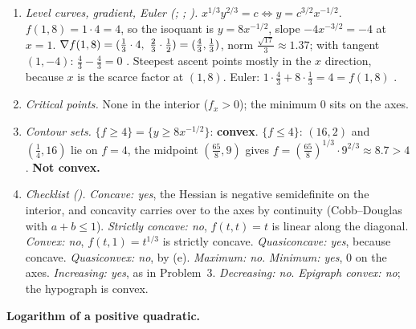 \begin{solutions}
\begin{enumerate}[label=(\alph*),leftmargin=1.8em,itemsep=0.4ex]
{                semidefinite}, not definite. The null direction is the ray
                itself: the first row times $(x,y)$ is
                $\tfrac29\bigl(-x^{-2/3}y^{2/3}+x^{-2/3}y^{2/3}\bigr)=0$,
                and likewise the second. Along a ray $f(tx,ty)=tf(x,y)$ is
                linear, so it has no curvature there.
          \item \emph{Level curves, gradient, Euler (;
                ; ).} $x^{1/3}y^{2/3}=c\iff y=c^{3/2}x^{-1/2}$.
                $f(1,8)=1\cdot4=4$, so the isoquant is $y=8x^{-1/2}$, slope
                $-4x^{-3/2}=-4$ at $x=1$. $\grad f(1,8)=
                (\tfrac13\cdot4,\ \tfrac23\cdot\tfrac12)=(\tfrac43,\tfrac13)$,
                norm $\tfrac{\sqrt{17}}{3}\approx1.37$; with tangent
                $(1,-4)$: $\tfrac43-\tfrac43=0$ \checkmark. Steepest ascent
                points mostly in the $x$ direction, because $x$ is the
                scarce factor at $(1,8)$. Euler: $1\cdot\tfrac43+8\cdot
                \tfrac13=4=f(1,8)$ \checkmark.
          \item \emph{Critical points.} None in the interior ($f_{x}>0$);
                the minimum $0$ sits on the axes.
          \item \emph{Contour sets.} $\{f\ge4\}=\{y\ge8x^{-1/2}\}$:
                \textbf{convex}. $\{f\le4\}$: $(16,2)$ and $(\tfrac14,16)$
                lie on $f=4$, the midpoint $(\tfrac{65}{8},9)$ gives
                $f=(\tfrac{65}{8})^{1/3}\cdot9^{2/3}\approx8.7>4$.
                \textbf{Not convex.}
          \item \emph{Checklist ().}
                \emph{Concave: yes}, the Hessian is negative semidefinite
                on the interior, and concavity carries over to the axes by
                continuity (Cobb--Douglas with $a+b\le1$).
                \emph{Strictly concave: no}, $f(t,t)=t$ is linear along the
                diagonal.
                \emph{Convex: no}, $f(t,1)=t^{1/3}$ is strictly concave.
                \emph{Quasiconcave: yes}, because concave.
                \emph{Quasiconvex: no}, by (e).
                \emph{Maximum: no}. \emph{Minimum: yes}, $0$ on the axes.
                \emph{Increasing: yes}, as in Problem~3.
                \emph{Decreasing: no}.
                \emph{Epigraph convex: no}; the hypograph is convex.
        \end{enumerate}
  \item \textbf{Logarithm of a positive quadratic.}

\end{solutions}

